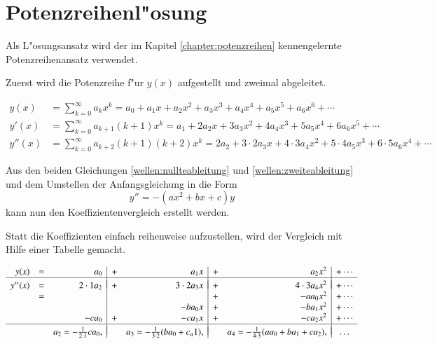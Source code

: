 \section{Potenzreihenl"osung}
Als L"osungsansatz wird der im Kapitel \ref{chapter:potenzreihen} 
kennengelernte Potenzreihenansatz verwendet.

Zuerst wird die Potenzreihe f"ur $y(x)$ aufgestellt und zweimal abgeleitet.

\begin{align}
	y(x)
	&=
	\sum_{k = 0}^{\infty} a_{k}x^k
	=
	a_0 + a_1x + a_2x^2 + a_3x^3 + a_4x^4 + a_5x^5 + a_6x^6 + \dotsb
	\label{wellen:nullteableitung}
	\\
	y'(x)
	&=
	\sum_{k=0}^{\infty} a_{k+1}(k+1)x^k
	=
	a_1 + 2a_2x + 3a_3x^2 + 4a_4x^3 + 5a_5x^4 + 6a_6x^5+ \dotsb
	\label{wellen:ersteableitung}
	\\
	y''(x)
	&=
	\sum_{k = 0}^{\infty} a_{k+2}(k+1)(k+2)x^k
	=
	2a_2 + 3 \mathbin{\cdot} 2a_3x + 4 \mathbin{\cdot} 3a_4x^2 + 5 
	\mathbin{\cdot} 4a_5x^3 + 6 \mathbin{\cdot} 5a_6x^4 + \dotsb
	\label{wellen:zweiteableitung}
\end{align}

Aus den beiden Gleichungen \ref{wellen:nullteableitung} und
\ref{wellen:zweiteableitung} und dem Umstellen der Anfangsgleichung in die Form
\begin{equation*}
	y'' = -(ax^2+bx+c)y
\end{equation*}
kann nun den Koeffizientenvergleich erstellt werden. 

Statt die Koeffizienten einfach reihenweise aufzustellen, wird der Vergleich 
mit Hilfe einer Tabelle gemacht.

\begin{equation}
	\begin{array}{r c r | c r | c r | c r c}
	y(x) & = &
	a_0 & + & a_1x & + & a_2x^2 & + \dotsb
	\\
	\hline&&&&&&&\\[-2ex]
	y''(x) & = &
	2\cdot1 a_2 & + & 3\cdot2 a_3x & + & 4\cdot3 a_4x^2 & + \dotsb
	\\
	& = &
	& & & + &- aa_0x^2 & + \dotsb
	\\
	& &
	& &- ba_0x & + &- ba_1x^2 & + \dotsb
	\\
	& &
	-ca_0 & + &- ca_1x & + &- ca_2x^2 & + \dotsb
	\\
	\hline&&&&&&&\\[-2ex]
	& &
	a_2 = -\frac{1}{2 \cdot 1}ca_0,
	& & a_3 = -\frac{1}{3 \cdot 2}(ba_0+c_a1),
	& & a_4 = -\frac{1}{4 \cdot 3}(aa_0+ba_1+ca_2),
	& \dots
	\end{array}
	\label{wellen:koeffizietenvergleichtabelle}
\end{equation}


